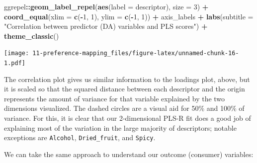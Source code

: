 \documentclass[
]{book}
\newenvironment{Shaded}{\begin{snugshade}}{\end{snugshade}}
\newcommand{\AttributeTok}[1]{\textcolor[rgb]{0.13,0.29,0.53}{#1}}
\newcommand{\DecValTok}[1]{\textcolor[rgb]{0.00,0.00,0.81}{#1}}
\newcommand{\FunctionTok}[1]{\textcolor[rgb]{0.13,0.29,0.53}{\textbf{#1}}}
\newcommand{\NormalTok}[1]{#1}
\newcommand{\SpecialCharTok}[1]{\textcolor[rgb]{0.81,0.36,0.00}{\textbf{#1}}}
\newcommand{\StringTok}[1]{\textcolor[rgb]{0.31,0.60,0.02}{#1}}
\begin{document}
\begin{Shaded}
\begin{Highlighting}[]
\NormalTok{  ggrepel}\SpecialCharTok{::}\FunctionTok{geom\_label\_repel}\NormalTok{(}\FunctionTok{aes}\NormalTok{(}\AttributeTok{label =}\NormalTok{ descriptor), }\AttributeTok{size =} \DecValTok{3}\NormalTok{) }\SpecialCharTok{+} 
  \FunctionTok{coord\_equal}\NormalTok{(}\AttributeTok{xlim =} \FunctionTok{c}\NormalTok{(}\SpecialCharTok{{-}}\DecValTok{1}\NormalTok{, }\DecValTok{1}\NormalTok{), }\AttributeTok{ylim =} \FunctionTok{c}\NormalTok{(}\SpecialCharTok{{-}}\DecValTok{1}\NormalTok{, }\DecValTok{1}\NormalTok{)) }\SpecialCharTok{+} 
\NormalTok{  axis\_labels }\SpecialCharTok{+} 
  \FunctionTok{labs}\NormalTok{(}\AttributeTok{subtitle =} \StringTok{"Correlation between predictor (DA) variables and PLS scores"}\NormalTok{) }\SpecialCharTok{+}
  \FunctionTok{theme\_classic}\NormalTok{()}
\end{Highlighting}
\end{Shaded}

\texttt{[image: 11-preference-mapping\_files/figure-latex/unnamed-chunk-16-1.pdf]}

The correlation plot gives us similar information to the loadings plot, above, but it is scaled so that the squared distance between each descriptor and the origin represents the amount of variance for that variable explained by the two dimensions visualized. The dashed circles are a visual aid for 50\% and 100\% of variance. For this, it is clear that our 2-dimensional PLS-R fit does a good job of explaining most of the variation in the large majority of descriptors; notable exceptions are \texttt{Alcohol}, \texttt{Dried\_fruit}, and \texttt{Spicy}.

We can take the same approach to understand our outcome (consumer) variables:
\end{document}
